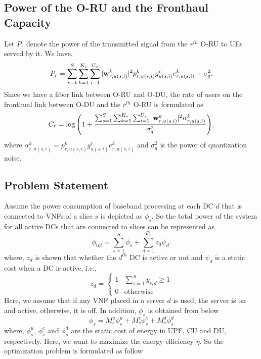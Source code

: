 \documentclass{article}
\begin{document}
\subsection{Power of the O-RU and the Fronthaul Capacity}
Let $P_r$ denote the power of the transmitted signal from the $r^{th}$ O-RU to UEs served by it. We have,
\begin{equation}\label{pr}
P_r = \sum_{s=1}^{S}\sum_{k=1}^{K_s}\sum_{i=1}^{U_s}|\bold{w}_{r,u(s,i)}^{k}|^2 p_{r,u(s,i)}^{k} g_{u(s,i)}^r e^k_{r,u(s,i)}+ \sigma_{q}^2.
\end{equation}
Since we have a fiber link between O-RU and O-DU, the rate of users on the fronthual link between O-DU and the $r^{th}$ O-RU  is formulated as
\begin{equation}\label{cr}
C_{r} = \log{\left(1+ \frac{\sum_{s=1}^{S}\sum_{k=1}^{K_s}\sum_{i=1}^{U_s}|\bold{w}_{r,u(s,i)}^{k}|^2 \mathcal{\alpha}^k_{r,u(s,i)} }{ \sigma_{q}^2}\right)},
\end{equation}
where $\mathcal{\alpha}^k_{r,u(s,i)}= p_{r,u(s,i)}^{k} g_{u(s,i)}^r e^k_{r,u(s,i)}$ and $\sigma_{q}^2$ is the power of quantization noise.
\subsection{Problem Statement}
Assume the power consumption of baseband processing at each DC $d$ that is connected to VNFs of a slice $s$ is depicted as
$\phi_{s}$. So the total power of the system for all active DCs that are connected to slices can be represented as
\begin{equation*}
\textstyle \phi_{tot} = \sum_{s=1}^{S}\phi_{s} + \sum_{d=1}^{D_c}z_d \psi_d .
\end{equation*}
where, $z_d$ is shown that whether the $d^{th}$ DC is active or not and $\psi_d$ is a static cost when a DC is active, i.e.,
\begin{equation}
  z_d =
    \begin{cases}
      1 & \sum_{s=1}^{S}y_{s,d} \geq 1 \\
      0 & \text{otherwise}
    \end{cases}       
\end{equation}  
Here, we assume that if any VNF placed in a server $d$ is used, the server is on and active, otherwise, it is off.
In addition, $\phi_{s}$ is obtained from below
\begin{equation}
\phi_{s} = M_s^u \phi_s^u + M_s^c \phi_s^c+ M_s^d \phi_s^d
\end{equation}
where, $\phi_s^u$, $\phi_s^c$ and $\phi_s^d$ are the static cost of energy in UPF, CU and DU, respectively.
Here, we want to maximize the energy efficiency $\eta$. 
So the optimization problem is formulated as follow
\end{document}
